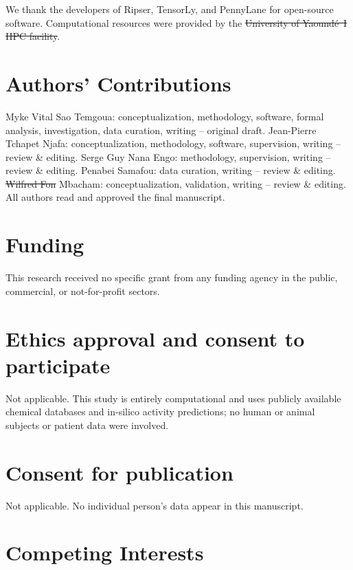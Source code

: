 \documentclass[11pt,a4paper]{article}
\providecommand{\DIFaddtex}[1]{{\protect\color{blue}\uwave{#1}}} %
\providecommand{\DIFdeltex}[1]{{\protect\color{red}\sout{#1}}}                      %
\providecommand{\DIFaddbegin}{} %
\providecommand{\DIFaddend}{} %
\providecommand{\DIFdelbegin}{} %
\providecommand{\DIFdelend}{} %
\providecommand{\DIFadd}[1]{\texorpdfstring{\DIFaddtex{#1}}{#1}} %
\providecommand{\DIFdel}[1]{\texorpdfstring{\DIFdeltex{#1}}{}} %
\newcommand{\DIFscaledelfig}{0.5}
\newlength{\DIFdelgraphicswidth} %
\newlength{\DIFdelgraphicsheight} %
\newcommand{\DIFaddincludegraphics}[2][]{{\color{blue}\fbox{\DIFOincludegraphics[#1]{#2}}}} %
\newcommand{\DIFdelincludegraphics}[2][]{%
\sbox{\DIFdelgraphicsbox}{\DIFOincludegraphics[#1]{#2}}%
\settoboxwidth{\DIFdelgraphicswidth}{\DIFdelgraphicsbox} %
\settoboxtotalheight{\DIFdelgraphicsheight}{\DIFdelgraphicsbox} %
\scalebox{\DIFscaledelfig}{%
\parbox[b]{\DIFdelgraphicswidth}{\usebox{\DIFdelgraphicsbox}\\[-\baselineskip] \rule{\DIFdelgraphicswidth}{0em}}\llap{\resizebox{\DIFdelgraphicswidth}{\DIFdelgraphicsheight}{%
\setlength{\unitlength}{\DIFdelgraphicswidth}%
\begin{picture}(1,1)%
\thicklines\linethickness{2pt} %
{\color[rgb]{1,0,0}\put(0,0){\framebox(1,1){}}}%
{\color[rgb]{1,0,0}\put(0,0){\line( 1,1){1}}}%
{\color[rgb]{1,0,0}\put(0,1){\line(1,-1){1}}}%
\end{picture}%
}\hspace*{3pt}}} %
} %
\DeclareRobustCommand{\DIFaddbegin}{\DIFOaddbegin \let\includegraphics\DIFaddincludegraphics} %
\DeclareRobustCommand{\DIFaddend}{\DIFOaddend \let\includegraphics\DIFOincludegraphics} %
\DeclareRobustCommand{\DIFdelbegin}{\DIFOdelbegin \let\includegraphics\DIFdelincludegraphics} %
\DeclareRobustCommand{\DIFdelend}{\DIFOaddend \let\includegraphics\DIFOincludegraphics} %
\begin{document}
We thank the developers of Ripser, TensorLy, and PennyLane for open-source software. Computational resources were provided by the \DIFdelbegin \DIFdel{University of Yaound\'{e}~I HPC facility}\DIFdelend \DIFaddbegin \DIFadd{Penavora Server}\DIFaddend .

\section*{Authors' Contributions}

Myke Vital Sao Temgoua: conceptualization, methodology, software, formal analysis, investigation, data curation, writing -- original draft. Jean-Pierre Tchapet Njafa: conceptualization, methodology, software, supervision, writing -- review \& editing. Serge Guy Nana Engo: methodology, supervision, writing -- review \& editing. Penabei Samafou: data curation, writing -- review \& editing. \DIFdelbegin \DIFdel{Wilfred Fon }\DIFdelend \DIFaddbegin \DIFadd{Fon Wilfred }\DIFaddend Mbacham: conceptualization, validation, writing -- review \& editing. All authors read and approved the final manuscript.

\section*{Funding}

This research received no specific grant from any funding agency in the public, commercial, or not-for-profit sectors.

\section*{Ethics approval and consent to participate}

Not applicable. This study is entirely computational and uses publicly available chemical databases and in-silico activity predictions; no human or animal subjects or patient data were involved.

\section*{Consent for publication}

Not applicable. No individual person's data appear in this manuscript.

\section*{Competing Interests}
\end{document}

